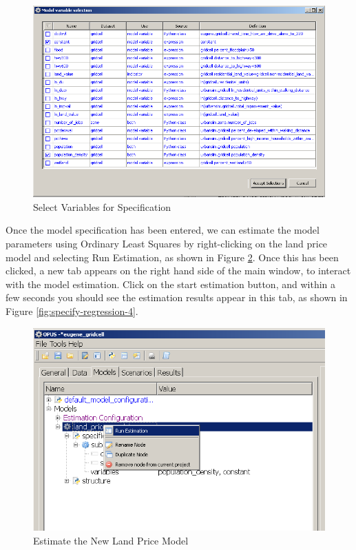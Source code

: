\begin{figure}[htp]
\begin{center}
\includegraphics[scale=0.6]{part-gui/images/model-manager-specify-regression-model-2.png}
\end{center}
\caption{Select Variables for Specification}
\label{fig:specify-regression-2}
\end{figure}


Once the model specification has been entered, we can estimate the model parameters using Ordinary Least Squares by right-clicking on the land price model and selecting Run Estimation, as shown in Figure \ref{fig:specify-regression-3}. Once this has been clicked, a new tab appears on the right hand side of the main window, to interact with the model estimation.  Click on the start estimation button, and within a few seconds you should see the estimation results appear in this tab, as shown in Figure \ref{fig:specify-regression-4}.

\begin{figure}[htp]
\begin{center}
\includegraphics[scale=0.6]{part-gui/images/model-manager-specify-regression-model-3.png}
\end{center}
\caption{Estimate the New Land Price Model}
\label{fig:specify-regression-3}
\end{figure}


